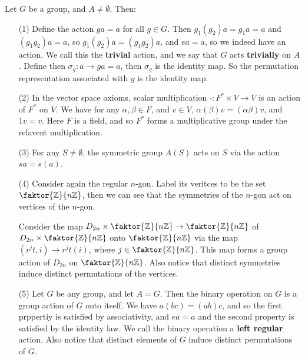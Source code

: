 \begin{example}
    Let $G$ be a group, and  $A \neq \emptyset$. Then:

    \begin{enumerate}
        \item[(1)] Define the action $ga=a$ for all  $g \in G$. Then
            $g_1(g_2)a=g_1a=a$ and $(g_1g_2)a=a$, so $g_1(g_2)a=(g_1g_2)a$, and
            $ea=a$, so we indeed have an action. We call this the
            \textbf{trivial} action, and we say that $G$ acts
            \textbf{trivially} on $A$. Define then  $\sigma_g:a \rightarrow
            ga=a$, then $\sigma_g$ is the identity map. So the permutation
            representation associated with  $g$ is the identity map.

        \item[(2)] In the vector space axioms, scalar multiplication $\cdot:F^*
            \times V \rightarrow V$ is an action of $F^*$ on  $V$. We have for any
             $\alpha,\beta \in F$, and  $v \in V$,
             $\alpha(\beta)v=(\alpha\beta)v$, and $1v=v$. Here $F$ is a field,
             and so  $F^*$ forms a multiplicative group under the relavent
             multiplication.

         \item [(3)] For any $S \neq \emptyset$, the symmetric group  $A(S)$
             acts on $S$ via the action  $sa=s(a)$.

         \item[(4)] Consider again the regular $n$-gon. Label its veritces to be
             the set $\faktor{\Z}{n\Z}$, then we can see that the symmetries of
             the $n$-gon act on vertices of the $n$-gon.

             Consider the map $D_{2n} \times \faktor{\Z}{n\Z}\rightarrow
             \faktor{\Z}{n\Z}$ of $D_{2n} \times \faktor{\Z}{n\Z}$ onto
             $\faktor{\Z}{n\Z}$ via the map $(r^jt,i) \rightarrow r^jt(i)$,
             where $j \in \faktor{\Z}{n\Z}$. This map forms a group action of
             $D_{2n}$ on $\faktor{\Z}{n\Z}$. Also notice that distinct
             symmetries induce distinct permutations of the vertices.

         \item[(5)] Let $G$ be any group, and let  $A=G$. Then the binary
             operation on $G$ is a group action of  $G$ onto itself. We have
             $a(bc)=(ab)c$, and so the first prppertiy is satisfied by
             associativity, and $ea=a$ and the second property is satisfied by
             the identity law. We call the binary operation a \textbf{left
             regular} action. Also notice that distinct elements of $G$ induce
             distinct permutations of  $G$.
    \end{enumerate}
\end{example}

